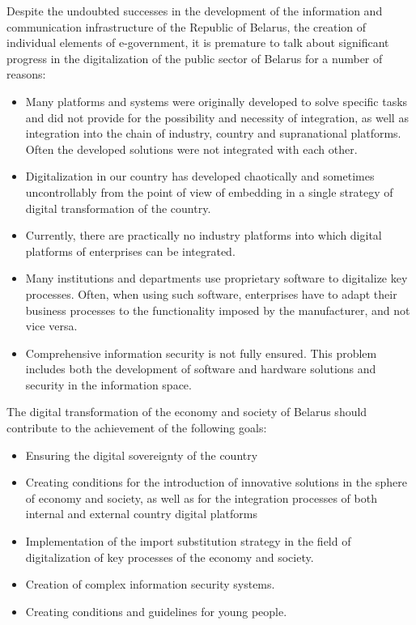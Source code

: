 \documentclass{article}
\begin{document}
\begin{multicols}{2}
Despite the undoubted successes in the development of
the information and communication infrastructure of the
Republic of Belarus, the creation of individual elements
of e-government, it is premature to talk about significant
progress in the digitalization of the public sector of
Belarus for a number of reasons:
\vspace{-5pt}
\begin{itemize}
 \setlength\itemsep{-4pt}
    \item Many platforms and systems were originally developed to solve specific tasks and did not provide for
the possibility and necessity of integration, as well
as integration into the chain of industry, country
and supranational platforms. Often the developed
solutions were not integrated with each other.
\item Digitalization in our country has developed chaotically and sometimes uncontrollably from the point
of view of embedding in a single strategy of digital
transformation of the country.
\item Currently, there are practically no industry platforms
into which digital platforms of enterprises can be
integrated.
\item Many institutions and departments use proprietary
software to digitalize key processes. Often, when
using such software, enterprises have to adapt their
business processes to the functionality imposed by
the manufacturer, and not vice versa.
\item Comprehensive information security is not fully ensured. This problem includes both the development
of software and hardware solutions and security in
the information space.
\end{itemize}
The digital transformation of the economy and society
of Belarus should contribute to the achievement of the
following goals:
\begin{itemize}
\setlength\itemsep{-4pt}
\item Ensuring the digital sovereignty of the country
\item Creating conditions for the introduction of innovative solutions in the sphere of economy and society,
as well as for the integration processes of both
internal and external country digital platforms
\item Implementation of the import substitution strategy
in the field of digitalization of key processes of the
economy and society.
\item Creation of complex information security systems.
\item Creating conditions and guidelines for young people.

\end{itemize}
\end{multicols}
\end{document}
